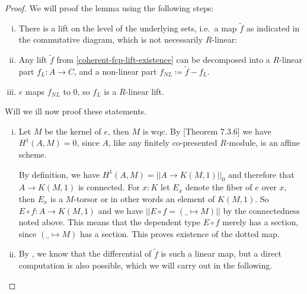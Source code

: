 \begin{proof}
  We will proof the lemma using the following steps:
  \begin{enumerate}[(i)]
  \item \label{coherent-fcp-lift-existence} There is a lift on the level of the underlying sets, i.e.\ a map $\tilde{f}$ as indicated in the commutative diagram, which is not necessarily $R$-linear:
    \begin{center}
    \end{center}
  \item Any lift $\tilde{f}$ from \ref{coherent-fcp-lift-existence} can be decomposed into a $R$-linear part $f_L:A\to C$, and a non-linear part $f_{NL}\coloneq\tilde{f}-f_L$.
  \item $e$ maps $f_{NL}$ to $0$, so $f_L$ is a $R$-linear lift.
  \end{enumerate}
  Will we ill now proof these statements.
  \begin{enumerate}[(i)]
  \item Let $M$ be the kernel of $e$, then $M$ is wqc.
  By \cite{draft}[Theorem 7.3.6] we have $H^1(A,M)=0$, since $A$, like any finitely co-presented $R$-module, is an affine scheme.

  By definition, we have $H^1(A,M)=||A\to K(M,1)||_0$ and therefore that $A\to K(M,1)$ is connected.
  For $x:K$ let $E_x$ denote the fiber of $e$ over $x$, then $E_x$ is a $M$-torsor or in other words an element of $K(M,1)$.
  So $E\circ f:A\to K(M,1)$ and we have $|| E\circ f = (\_\mapsto M) ||$ by the connectedness noted above.
  This means that the dependent type $E\circ f$ merely has a section, since $(\_\mapsto M)$ has a section.
  This proves existence of the dotted map.
  \item By \cite{diffgeo-draft}, we know that the differential of $\tilde{f}$ is such a linear map,
  but a direct computation is also possible, which we will carry out in the following.
  

\end{enumerate}
\end{proof}
